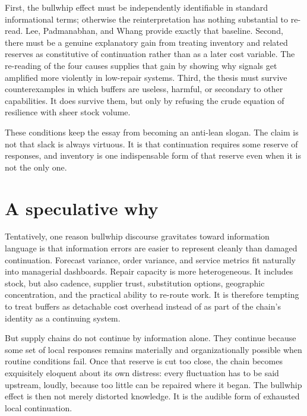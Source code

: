 \documentclass[11pt]{article}
\begin{document}
First, the bullwhip effect must be independently identifiable in standard informational terms; otherwise the reinterpretation has nothing substantial to re-read. Lee, Padmanabhan, and Whang provide exactly that baseline. Second, there must be a genuine explanatory gain from treating inventory and related reserves as constitutive of continuation rather than as a later cost variable. The re-reading of the four causes supplies that gain by showing why signals get amplified more violently in low-repair systems. Third, the thesis must survive counterexamples in which buffers are useless, harmful, or secondary to other capabilities. It does survive them, but only by refusing the crude equation of resilience with sheer stock volume.

These conditions keep the essay from becoming an anti-lean slogan. The claim is not that slack is always virtuous. It is that continuation requires some reserve of \admissible responses, and inventory is one indispensable form of that reserve even when it is not the only one.

\section{A speculative why}
Tentatively, one reason bullwhip discourse gravitates toward information language is that information errors are easier to represent cleanly than damaged continuation. Forecast variance, order variance, and service metrics fit naturally into managerial dashboards. Repair capacity is more heterogeneous. It includes stock, but also cadence, supplier trust, substitution options, geographic concentration, and the practical ability to re-route work. It is therefore tempting to treat buffers as detachable cost overhead instead of as part of the chain's identity as a continuing system.

But supply chains do not continue by information alone. They continue because some set of local responses remains materially and organizationally possible when routine conditions fail. Once that reserve is cut too close, the chain becomes exquisitely eloquent about its own distress: every fluctuation has to be said upstream, loudly, because too little can be repaired where it began. The bullwhip effect is then not merely distorted knowledge. It is the audible form of exhausted local continuation.
\end{document}
